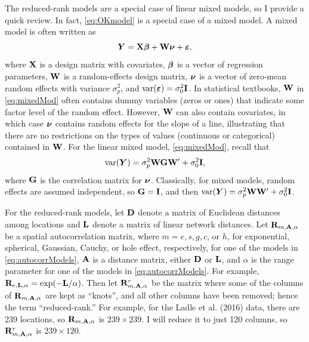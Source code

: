 \documentclass[11pt, titlepage]{article}\usepackage[]{graphicx}\usepackage[]{color}
\begin{document}
\begin{spacing}{1.9}
\begin{flushleft}
The reduced-rank models are a special case of linear mixed models, so I provide a quick review. In fact, \ref{eq:OKmodel} is a special case of a mixed model. A mixed model is often written as
\begin{equation} \label{eq:mixedMod}
    \bm Y = \mathbf{X}{\boldsymbol{\beta}} + \mathbf{W}\mbox{\boldmath $\nu$} + \mbox{\boldmath $\varepsilon$},
\end{equation}
 where $\mathbf{X}$ is a design matrix with covariates, ${\boldsymbol{\beta}}$ is a vector of regression parameters, $\mathbf{W}$ is a random-effects design matrix, $\mbox{\boldmath $\nu$}$ is a vector of zero-mean random effects with variance $\sigma^2_p$, and $\textrm{var}(\mbox{\boldmath $\varepsilon$}) = \sigma^2_0 \mathbf{I}$.  In statistical textbooks, $\mathbf{W}$ in \ref{eq:mixedMod} often contains dummy variables (zeros or ones) that indicate some factor level of the random effect.  However, $\mathbf{W}$ can also contain covariates, in which case $\mbox{\boldmath $\nu$}$ contains random effects for the slope of a line, illustrating that there are no restrictions on the types of values (continuous or categorical) contained in $\mathbf{W}$. For the linear mixed model, \ref{eq:mixedMod}, recall that
 \begin{equation} \label{eq:varMixedMod}
 \textrm{var}(\bm Y) = \sigma^2_p\mathbf{W}\mathbf{G}\mathbf{W}^{\prime} + \sigma^2_0\mathbf{I}, 
 \end{equation}
 where $\mathbf{G}$ is the correlation matrix for $\mbox{\boldmath $\nu$}$.  Classically, for mixed models, random effects are assumed independent, so $\mathbf{G} = \mathbf{I}$, and then $\textrm{var}(\bm Y) = \sigma^2_p\mathbf{W}\mathbf{W}^{\prime} + \sigma^2_0\mathbf{I}$.  

 For the reduced-rank models, let $\mathbf{D}$ denote a matrix of Euclidean distances among locations and $\mathbf{L}$ denote a matrix of linear network distances. Let $\mathbf{R}_{m,\mathbf{A},\alpha}$ be a spatial autocorrelation matrix, where $m = e, s, g, c$, or $h$, for exponential, spherical, Gaussian, Cauchy, or hole effect, respectively, for one of the models in \ref{eq:autocorrModels}, $\mathbf{A}$ is a distance matrix, either $\mathbf{D}$ or $\mathbf{L}$, and $\alpha$ is the range parameter for one of the models in \ref{eq:autocorrModels}.  For example, $\mathbf{R}_{e,\mathbf{L},\alpha} = \exp(-\mathbf{L}/\alpha)$.  Then let $\mathbf{R}^r_{m,\mathbf{A},\alpha}$ be the matrix where some of the columns of $\mathbf{R}_{m,\mathbf{A},\alpha}$ are kept as ``knots'', and all other columns have been removed; hence the term ``reduced-rank.''  For example, for the Ladle et al. (2016) data, there are 239 locations, so $\mathbf{R}_{m,\mathbf{A},\alpha}$ is $239 \times 239$. I will reduce it to just 120 columns, so $\mathbf{R}^r_{m,\mathbf{A},\alpha}$ is $239 \times 120$.


\end{flushleft}
\end{spacing}
\end{document}
